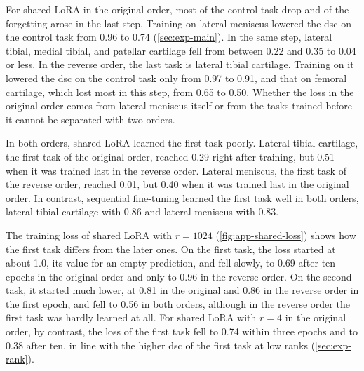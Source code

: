 For shared LoRA in the original order, most of the control-task drop and of the forgetting arose in the last step.
Training on lateral meniscus lowered the \gls{dsc} on the control task from 0.96 to 0.74 (\cref{sec:exp-main}).
In the same step, lateral tibial, medial tibial, and patellar cartilage fell from between 0.22 and 0.35 to 0.04 or less.
In the reverse order, the last task is lateral tibial cartilage.
Training on it lowered the \gls{dsc} on the control task only from 0.97 to 0.91, and that on femoral cartilage, which lost most in this step, from 0.65 to 0.50.
Whether the loss in the original order comes from lateral meniscus itself or from the tasks trained before it cannot be separated with two orders.

In both orders, shared LoRA learned the first task poorly.
Lateral tibial cartilage, the first task of the original order, reached 0.29 right after training, but 0.51 when it was trained last in the reverse order.
Lateral meniscus, the first task of the reverse order, reached 0.01, but 0.40 when it was trained last in the original order.
In contrast, sequential fine-tuning learned the first task well in both orders, lateral tibial cartilage with 0.86 and lateral meniscus with 0.83.

The training loss of shared LoRA with $r = 1024$ (\cref{fig:app-shared-loss}) shows how the first task differs from the later ones.
On the first task, the loss started at about 1.0, its value for an empty prediction, and fell slowly, to 0.69 after ten epochs in the original order and only to 0.96 in the reverse order.
On the second task, it started much lower, at 0.81 in the original and 0.86 in the reverse order in the first epoch, and fell to 0.56 in both orders, although in the reverse order the first task was hardly learned at all.
For shared LoRA with $r = 4$ in the original order, by contrast, the loss of the first task fell to 0.74 within three epochs and to 0.38 after ten, in line with the higher \gls{dsc} of the first task at low ranks (\cref{sec:exp-rank}).

